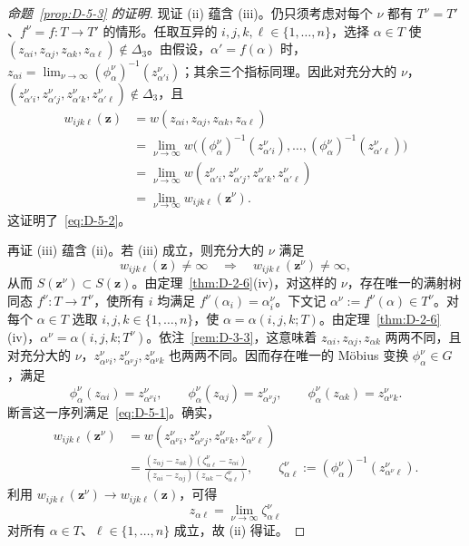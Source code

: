 \begin{proof}[命题~\ref{prop:D-5-3} 的证明]
现证 (ii) 蕴含 (iii)。仍只须考虑对每个 $\nu$ 都有 $T^\nu=T'$、$f^\nu=f:T\to T'$ 的情形。任取互异的 $i,j,k,\ell\in\{1,\ldots,n\}$，选择 $\alpha\in T$ 使 $(z_{\alpha i},z_{\alpha j},z_{\alpha k},z_{\alpha\ell})\notin\Delta_3$。由假设，$\alpha'=f(\alpha)$ 时，$z_{\alpha i}=\lim_{\nu\to\infty}(\phi_\alpha^\nu)^{-1}(z_{\alpha'i}^\nu)$；其余三个指标同理。因此对充分大的 $\nu$，$(z_{\alpha'i}^\nu,z_{\alpha'j}^\nu,z_{\alpha'k}^\nu,z_{\alpha'\ell}^\nu)\notin\Delta_3$，且
\begin{align*}
  w_{ijk\ell}(\mathbf z)
  &=w(z_{\alpha i},z_{\alpha j},z_{\alpha k},z_{\alpha\ell})\\
  &=\lim_{\nu\to\infty}w\bigl((\phi_\alpha^\nu)^{-1}(z_{\alpha'i}^\nu),\ldots,
      (\phi_\alpha^\nu)^{-1}(z_{\alpha'\ell}^\nu)\bigr)\\
  &=\lim_{\nu\to\infty}w(z_{\alpha'i}^\nu,z_{\alpha'j}^\nu,
      z_{\alpha'k}^\nu,z_{\alpha'\ell}^\nu)\\
  &=\lim_{\nu\to\infty}w_{ijk\ell}(\mathbf z^\nu).
\end{align*}
这证明了~\eqref{eq:D-5-2}。

再证 (iii) 蕴含 (ii)。若 (iii) 成立，则充分大的 $\nu$ 满足
\[
  w_{ijk\ell}(\mathbf z)\ne\infty\quad\Longrightarrow\quad
  w_{ijk\ell}(\mathbf z^\nu)\ne\infty,
\]
从而 $S(\mathbf z^\nu)\subset S(\mathbf z)$。由定理~\ref{thm:D-2-6}(iv)，对这样的 $\nu$，存在唯一的满射树同态 $f^\nu:T\to T^\nu$，使所有 $i$ 均满足 $f^\nu(\alpha_i)=\alpha_i^\nu$。下文记 $\alpha^\nu:=f^\nu(\alpha)\in T^\nu$。对每个 $\alpha\in T$ 选取 $i,j,k\in\{1,\ldots,n\}$，使 $\alpha=\alpha(i,j,k;T)$。由定理~\ref{thm:D-2-6}(iv)，$\alpha^\nu=\alpha(i,j,k;T^\nu)$。依注~\ref{rem:D-3-3}，这意味着 $z_{\alpha i},z_{\alpha j},z_{\alpha k}$ 两两不同，且对充分大的 $\nu$，$z_{\alpha^\nu i}^\nu,z_{\alpha^\nu j}^\nu,z_{\alpha^\nu k}^\nu$ 也两两不同。因而存在唯一的 Möbius 变换 $\phi_\alpha^\nu\in G$，满足
\[
  \phi_\alpha^\nu(z_{\alpha i})=z_{\alpha^\nu i}^\nu,\qquad
  \phi_\alpha^\nu(z_{\alpha j})=z_{\alpha^\nu j}^\nu,\qquad
  \phi_\alpha^\nu(z_{\alpha k})=z_{\alpha^\nu k}^\nu.
\]
断言这一序列满足~\eqref{eq:D-5-1}。确实，
\begin{align*}
  w_{ijk\ell}(\mathbf z^\nu)
  &=w(z_{\alpha^\nu i}^\nu,z_{\alpha^\nu j}^\nu,
      z_{\alpha^\nu k}^\nu,z_{\alpha^\nu\ell}^\nu)\\
  &=\frac{(z_{\alpha j}-z_{\alpha k})(\zeta_{\alpha\ell}^\nu-z_{\alpha i})}
          {(z_{\alpha i}-z_{\alpha j})(z_{\alpha k}-\zeta_{\alpha\ell}^\nu)},
  \qquad
  \zeta_{\alpha\ell}^\nu:=(\phi_\alpha^\nu)^{-1}
       (z_{\alpha^\nu\ell}^\nu).
\end{align*}
利用 $w_{ijk\ell}(\mathbf z^\nu)\to w_{ijk\ell}(\mathbf z)$，可得
\[
  z_{\alpha\ell}=\lim_{\nu\to\infty}\zeta_{\alpha\ell}^\nu
\]
对所有 $\alpha\in T$、$\ell\in\{1,\ldots,n\}$ 成立，故 (ii) 得证。


\end{proof}

